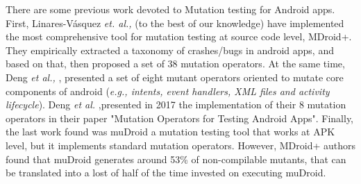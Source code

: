 There are some previous work devoted to Mutation testing for Android apps. First, Linares-V\'asquez \textit{et. al.,}\cite{linares2017enabling,Moran:ICSE18} (to the best of our knowledge) have implemented the most comprehensive tool for mutation testing at source code level, MDroid+. They empirically extracted a taxonomy of crashes/bugs in android apps, and based on that, then proposed a set of 38 mutation operators. At the same time, Deng \textit{et al., } \cite{deng2015towards}, presented a set of eight mutant operators oriented to mutate core components of android (\textit{e.g., intents, event handlers, XML files and activity lifecycle}). Deng \textit{et al.} ,presented in 2017 the implementation of their 8 mutation operators in their paper "Mutation Operators for Testing Android Apps"\cite{deng2017mutation}. Finally, the last work found was muDroid\cite{mudroid} a mutation testing tool that works at APK level, but it implements standard mutation operators. However, MDroid+ authors \cite{linares2017enabling,Moran:ICSE18}  found that muDroid generates around 53\% of non-compilable mutants, that can be translated into a lost of half of the time invested on executing muDroid.

